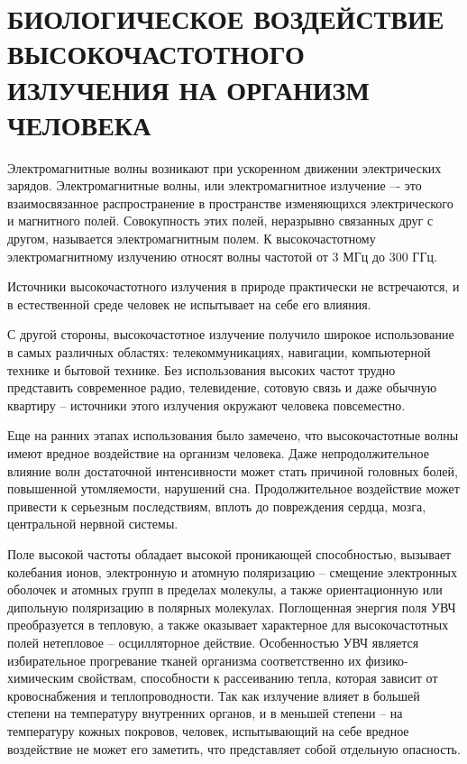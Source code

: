 \chapter{БИОЛОГИЧЕСКОЕ ВОЗДЕЙСТВИЕ ВЫСОКОЧАСТОТНОГО ИЗЛУЧЕНИЯ НА ОРГАНИЗМ ЧЕЛОВЕКА}

Электромагнитные волны возникают при ускоренном движении электрических зарядов. 
Электромагнитные волны, или электромагнитное излучение –- это взаимосвязанное 
распространение в пространстве изменяющихся электрического и магнитного полей. 
Совокупность этих полей, неразрывно связанных друг с другом, называется электромагнитным 
полем. К высокочастотному электромагнитному излучению относят волны частотой от 3 МГц до 300 ГГц.\cite{2011ecology}

Источники высокочастотного излучения в природе практически не встречаются, и в естественной
среде человек не испытывает на себе его влияния.

С другой стороны, высокочастотное излучение получило широкое использование в самых
различных областях: телекоммуникациях, навигации, компьютерной технике и бытовой технике.
Без использования высоких частот трудно представить современное радио, телевидение,
сотовую связь и даже обычную квартиру -- источники этого излучения окружают человека 
повсеместно.

Еще на ранних этапах использования было замечено, что высокочастотные волны имеют
вредное воздействие на организм человека. Даже непродолжительное влияние волн
достаточной интенсивности может стать причиной головных болей, повышенной утомляемости, 
нарушений сна. Продолжительное воздействие может привести к серьезным последствиям,
вплоть до повреждения сердца, мозга, центральной нервной системы.

Поле высокой частоты обладает высокой проникающей способностью, вызывает колебания ионов, 
электронную и атомную поляризацию -- смещение электронных оболочек и атомных групп в 
пределах молекулы, а также ориентационную или дипольную поляризацию в полярных молекулах.
Поглощенная энергия поля УВЧ преобразуется в тепловую, а также оказывает характерное для 
высокочастотных полей нетепловое -- осцилляторное действие.
Особенностью УВЧ является избирательное прогревание тканей организма соответственно их 
физико-химическим свойствам, способности к рассеиванию тепла, которая зависит от 
кровоснабжения и теплопроводности. Так как излучение влияет в большей степени на температуру
внутренних органов, и в меньшей степени -- на температуру кожных покровов, человек,
испытывающий на себе вредное воздействие не может его заметить, что представляет собой
отдельную опасность.

